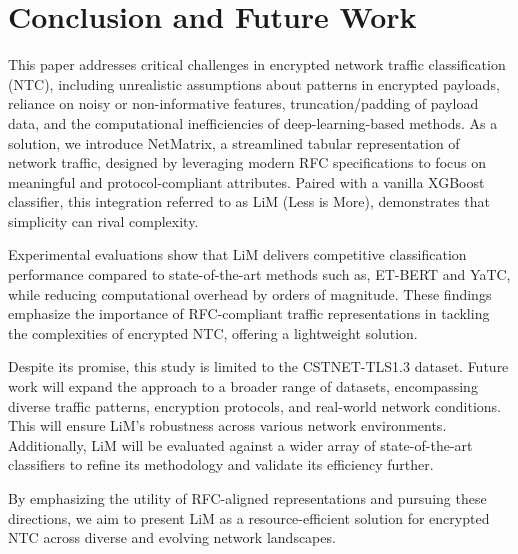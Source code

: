 \section{Conclusion and Future Work}
This paper addresses critical challenges in encrypted network traffic classification (NTC), including unrealistic assumptions about patterns in encrypted payloads, reliance on noisy or non-informative features, truncation/padding of payload data, and the computational inefficiencies of deep-learning-based methods. As a solution, we introduce NetMatrix, a streamlined tabular representation of network traffic, designed by leveraging modern RFC specifications to focus on meaningful and protocol-compliant attributes. Paired with a vanilla XGBoost classifier, this integration referred to as LiM (Less is More), demonstrates that simplicity can rival complexity.

Experimental evaluations show that LiM delivers competitive classification performance compared to state-of-the-art methods such as, ET-BERT and YaTC, while reducing computational overhead by orders of magnitude. These findings emphasize the importance of RFC-compliant traffic representations in tackling the complexities of encrypted NTC, offering a lightweight solution.

Despite its promise, this study is limited to the CSTNET-TLS1.3 dataset. Future work will expand the approach to a broader range of datasets, encompassing diverse traffic patterns, encryption protocols, and real-world network conditions. This will ensure LiM’s robustness across various network environments. Additionally, LiM will be evaluated against a wider array of state-of-the-art classifiers to refine its methodology and validate its efficiency further.

By emphasizing the utility of RFC-aligned representations and pursuing these directions, we aim to present LiM as a resource-efficient solution for encrypted NTC across diverse and evolving network landscapes.


